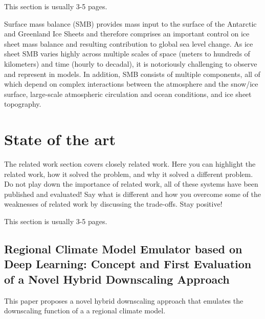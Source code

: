 \documentclass[a4paper,11pt,oneside]{report}
\begin{document}
This section is usually 3-5 pages.

Surface mass balance (SMB) provides mass input to the surface of the Antarctic and Greenland Ice Sheets and therefore comprises an important control on ice sheet mass balance and resulting contribution to global sea level change. As ice sheet SMB varies highly across multiple scales of space (meters to hundreds of kilometers) and time (hourly to decadal), it is notoriously challenging to observe and represent in models. In addition, SMB consists of multiple components, all of which depend on complex interactions between the atmosphere and the snow/ice surface, large-scale atmospheric circulation and ocean conditions, and ice sheet topography.~\cite{Lenaerts}

\chapter{State of the art}

The related work section covers closely related work. Here you can highlight
the related work, how it solved the problem, and why it solved a different
problem. Do not play down the importance of related work, all of these
systems have been published and evaluated! Say what is different and how
you overcome some of the weaknesses of related work by discussing the 
trade-offs. Stay positive!

This section is usually 3-5 pages.

\section{Regional Climate Model Emulator based on Deep Learning: Concept and First Evaluation of a Novel Hybrid Downscaling Approach \cite{Doury}}
This paper proposes a novel hybrid downscaling approach that emulates the downscaling function of a a regional climate model.
\end{document}
